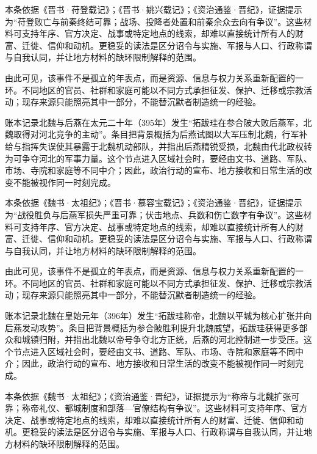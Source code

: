 本条依据《晋书·苻登载记》；《晋书·姚兴载记》；《资治通鉴·晋纪》，证据提示为“苻登败亡与前秦终结可靠；战场、投降者处置和前秦余众去向有争议”。这些材料可支持年序、官方决定、战事或特定地点的线索，却难以直接统计所有人的财富、迁徙、信仰和动机。更稳妥的读法是区分诏令与实施、军报与人口、行政称谓与自我认同，并让地方材料的缺环限制解释的范围。

由此可见，该事件不是孤立的年表点，而是资源、信息与权力关系重新配置的一环。不同地区的官员、社群和家庭可能以不同方式承担征发、保护、迁移或宗教活动；现存来源只能照亮其中一部分，不能替沉默者制造统一的经验。

账本记录北魏与后燕在太元二十年（395年）发生“拓跋珪在参合陂大败后燕军，北魏取得对河北竞争的主动”。条目把背景概括为后燕试图以大军压制北魏，行军补给与指挥失误使其暴露于北魏机动部队，并指出后燕精锐受损，北魏由代北政权转为可争夺河北的军事力量。这个节点进入区域社会时，要经由文书、道路、军队、市场、寺院和家庭等不同中介；因此，政治行动的宣布、地方接收和日常生活的改变不能被视作同一时刻完成。

本条依据《魏书·太祖纪》；《晋书·慕容宝载记》；《资治通鉴·晋纪》，证据提示为“战役胜负与后燕军损失严重可靠；伏击地点、兵数和伤亡数字有争议”。这些材料可支持年序、官方决定、战事或特定地点的线索，却难以直接统计所有人的财富、迁徙、信仰和动机。更稳妥的读法是区分诏令与实施、军报与人口、行政称谓与自我认同，并让地方材料的缺环限制解释的范围。

由此可见，该事件不是孤立的年表点，而是资源、信息与权力关系重新配置的一环。不同地区的官员、社群和家庭可能以不同方式承担征发、保护、迁移或宗教活动；现存来源只能照亮其中一部分，不能替沉默者制造统一的经验。

账本记录北魏在皇始元年（396年）发生“拓跋珪称帝，北魏以平城为核心扩张并向后燕发动攻势”。条目把背景概括为参合陂胜利提升北魏威望，拓跋珪获得更多部众和城镇归附，并指出北魏以帝号争夺北方正统，后燕的河北控制进一步受压。这个节点进入区域社会时，要经由文书、道路、军队、市场、寺院和家庭等不同中介；因此，政治行动的宣布、地方接收和日常生活的改变不能被视作同一时刻完成。

本条依据《魏书·太祖纪》；《资治通鉴·晋纪》，证据提示为“称帝与北魏扩张可靠；称帝礼仪、都城制度和部落—官僚结构有争议”。这些材料可支持年序、官方决定、战事或特定地点的线索，却难以直接统计所有人的财富、迁徙、信仰和动机。更稳妥的读法是区分诏令与实施、军报与人口、行政称谓与自我认同，并让地方材料的缺环限制解释的范围。

